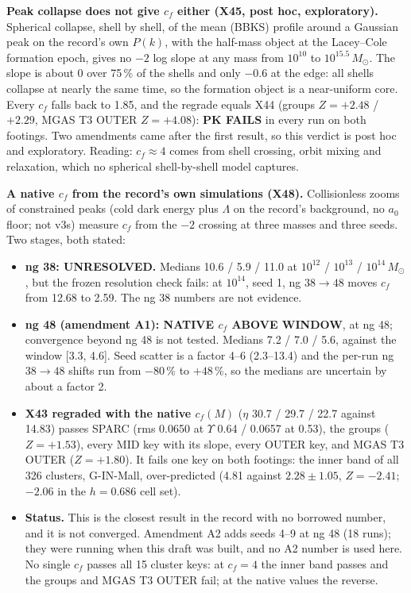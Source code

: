 \documentclass[10pt]{article}
\begin{document}
\textbf{Peak collapse does not give $c_f$ either (X45, post hoc, exploratory).} Spherical collapse, shell by shell, of the mean (BBKS) profile around a Gaussian peak on the record's own $P(k)$, with the half-mass object at the Lacey--Cole formation epoch, gives no $-2$ log slope at any mass from $10^{10}$ to $10^{15.5}\,M_\odot$. The slope is about 0 over 75\,\% of the shells and only $-0.6$ at the edge: all shells collapse at nearly the same time, so the formation object is a near-uniform core. Every $c_f$ falls back to 1.85, and the regrade equals X44 (groups $Z=+2.48$ / $+2.29$, MGAS T3 OUTER $Z=+4.08$): \textbf{PK FAILS} in every run on both footings. Two amendments came after the first result, so this verdict is post hoc and exploratory. Reading: $c_f\approx4$ comes from shell crossing, orbit mixing and relaxation, which no spherical shell-by-shell model captures.

\textbf{A native $c_f$ from the record's own simulations (X48).} Collisionless zooms of constrained peaks (cold dark energy plus $\Lambda$ on the record's background, no $a_0$ floor; not v3s) measure $c_f$ from the $-2$ crossing at three masses and three seeds. Two stages, both stated:
\begin{itemize}
\item \textbf{ng 38: UNRESOLVED.} Medians 10.6 / 5.9 / 11.0 at $10^{12}$ / $10^{13}$ / $10^{14}\,M_\odot$, but the frozen resolution check fails: at $10^{14}$, seed 1, ng $38\to48$ moves $c_f$ from 12.68 to 2.59. The ng 38 numbers are not evidence.
\item \textbf{ng 48 (amendment A1): NATIVE $c_f$ ABOVE WINDOW}, at ng 48; convergence beyond ng 48 is not tested. Medians 7.2 / 7.0 / 5.6, against the window [3.3, 4.6]. Seed scatter is a factor 4--6 (2.3--13.4) and the per-run ng $38\to48$ shifts run from $-80$\,\% to $+48$\,\%, so the medians are uncertain by about a factor 2.
\item \textbf{X43 regraded with the native $c_f(M)$} ($\eta$ 30.7 / 29.7 / 22.7 against 14.83) passes SPARC (rms 0.0650 at $\Upsilon$ 0.64 / 0.0657 at 0.53), the groups ($Z=+1.53$), every MID key with its slope, every OUTER key, and MGAS T3 OUTER ($Z=+1.80$). It fails one key on both footings: the inner band of all 326 clusters, G-IN-Mall, over-predicted (4.81 against $2.28\pm1.05$, $Z=-2.41$; $-2.06$ in the $h=0.686$ cell set).
\item \textbf{Status.} This is the closest result in the record with no borrowed number, and it is not converged. Amendment A2 adds seeds 4--9 at ng 48 (18 runs); they were running when this draft was built, and no A2 number is used here. No single $c_f$ passes all 15 cluster keys: at $c_f=4$ the inner band passes and the groups and MGAS T3 OUTER fail; at the native values the reverse.
\end{itemize}
\end{document}
